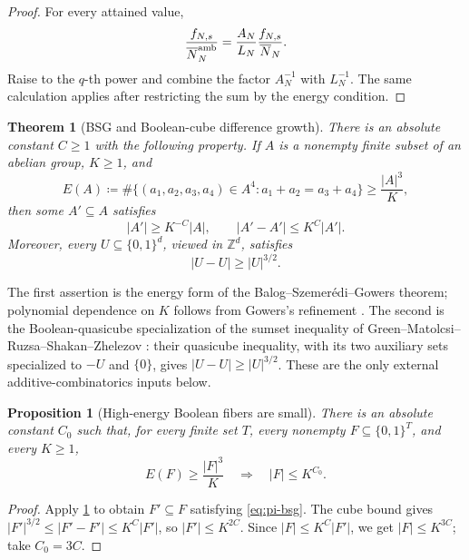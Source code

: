 \documentclass[11pt,a4paper]{amsart}
\numberwithin{equation}{section}
\newtheorem{theorem}{Theorem}[section]
\newtheorem{proposition}[proposition]{Proposition}
\theoremstyle{remark}
\newcommand{\Z}{\mathbb Z}
\newcommand{\barN}{\overline N}
\newcommand{\abs}[1]{\lvert #1\rvert}
\newcommand{\defeq}{\coloneqq}
\begin{document}
\begin{proof}
For every attained value,
\[
 \frac{f_{N,s}}{\barN_N^{\rm amb}}
 =\frac{A_N}{L_N}\frac{f_{N,s}}{\barN_N}.
\]
Raise to the \(q\)-th power and combine the factor \(A_N^{-1}\) with
\(L_N^{-1}\).  The same calculation applies after restricting the sum by
the energy condition.
\end{proof}

\begin{theorem}[BSG and Boolean-cube difference growth]
\label{thm:bsg-cube-package}
There is an absolute constant \(C\ge1\) with the following property.  If
\(A\) is a nonempty finite subset of an abelian group, \(K\ge1\), and
\[
 E(A)\defeq
 \#\{(a_1,a_2,a_3,a_4)\in A^4:a_1+a_2=a_3+a_4\}
 \ge\frac{\abs A^3}{K},
\]
then some \(A'\subseteq A\) satisfies
\[
 \abs{A'}\ge K^{-C}\abs A,\qquad
 \abs{A'-A'}\le K^C\abs{A'} .                       \tag{PI4}\label{eq:pi-bsg}
\]
Moreover, every \(U\subseteq\{0,1\}^d\), viewed in \(\Z^d\), satisfies
\[
                         \abs{U-U}\ge\abs U^{3/2}.  \tag{PI5}\label{eq:pi-cube}
\]
\end{theorem}

The first assertion is the energy form of the
Balog--Szemer\'edi--Gowers theorem; polynomial dependence on \(K\) follows
from Gowers's refinement \cite{BalogSzemeredi,GowersSzemeredi}.  The second
is the Boolean-quasicube specialization of the sumset inequality of
Green--Matolcsi--Ruzsa--Shakan--Zhelezov
\cite{GreenMatolcsiRuzsaShakanZhelezov}: their quasicube inequality,
with its two auxiliary sets specialized to \(-U\) and \(\{0\}\), gives
\(\abs{U-U}\ge\abs U^{3/2}\).  These are the only external
additive-combinatorics inputs below.

\begin{proposition}[High-energy Boolean fibers are small]
\label{prop:high-energy-boolean-small}
There is an absolute constant \(C_0\) such that, for every
finite set \(T\), every nonempty \(F\subseteq\{0,1\}^T\), and every
\(K\ge1\),
\[
                 E(F)\ge\frac{\abs F^3}{K}
                 \quad\Longrightarrow\quad
                 \abs F\le K^{C_0}.                 \tag{PI6}\label{eq:pi-high-energy}
\]
\end{proposition}

\begin{proof}
Apply \cref{thm:bsg-cube-package} to obtain \(F'\subseteq F\) satisfying
\eqref{eq:pi-bsg}.  The cube bound gives
\(\abs{F'}^{3/2}\le\abs{F'-F'}\le K^C\abs{F'}\), so
\(\abs{F'}\le K^{2C}\).  Since
\(\abs F\le K^C\abs{F'}\), we get \(\abs F\le K^{3C}\); take
\(C_0=3C\).
\end{proof}
\end{document}
